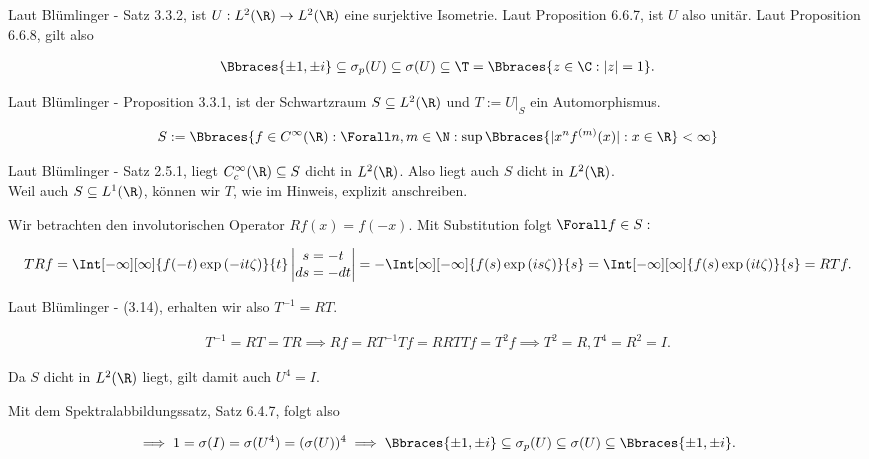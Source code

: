 \begin{solution}
Laut Blümlinger - Satz 3.3.2, ist $U: L^2(\R) \to L^2(\R)$ eine surjektive Isometrie.
Laut Proposition 6.6.7, ist $U$ also unitär.
Laut Proposition 6.6.8, gilt also

\begin{align*}
  \Bbraces{\pm 1, \pm i}
  \subseteq
  \sigma_p(U)
  \subseteq
  \sigma(U)
  \subseteq
  \T
  =
  \Bbraces{z \in \C: |z| = 1}.
\end{align*}


Laut Blümlinger - Proposition 3.3.1, ist der Schwartzraum $S \subseteq L^2(\R)$ und $T := U|_S$ ein Automorphismus.

\begin{align*}
  S
  :=
  \Bbraces
  {
    f \in C^\infty(\R):
    \Forall n, m \in \N:
    \sup \Bbraces{|x^n f^{(m)}(x)| : x \in \R} < \infty
  }
\end{align*}


Laut Blümlinger - Satz 2.5.1, liegt $C_c^\infty(\R) \subseteq S$ dicht in $L^2(\R)$.
Also liegt auch $S$ dicht in $L^2(\R)$. \\

Weil auch $S \subseteq L^1(\R)$, können wir $T$, wie im Hinweis, explizit anschreiben. \\


Wir betrachten den involutorischen Operator $R f(x) = f(-x)$.
Mit Substitution folgt $\Forall f \in S:$

\begin{align*}
  T R f
  =
  \Int[-\infty][\infty]
  {f(-t) \exp{(-i t \zeta)}}{t}
  \begin{vmatrix}
    s = -t \\
    ds = -dt
  \end{vmatrix}
  =
  -\Int[\infty][-\infty]{f(s) \exp{(i s \zeta)}}{s}
  =
  \Int[-\infty][\infty]{f(s) \exp{(i t \zeta)}}{s}
  =
  R T f.
\end{align*}

Laut Blümlinger - (3.14), erhalten wir also $T^{-1} = R T$.

\begin{align*}
  T^{-1} = R T = T R
  \implies
  R f = R T^{-1} T f = R R T T f = T^2 f
  \implies
  T^2 = R, T^4 = R^2 = I.
\end{align*}

Da $S$ dicht in $L^2(\R)$ liegt, gilt damit auch $U^4 = I$.


Mit dem Spektralabbildungssatz, Satz 6.4.7, folgt also

\begin{align*}
  \implies
  1 = \sigma(I) = \sigma(U^4) = (\sigma(U))^4
  \implies
  \Bbraces{\pm 1, \pm i}
  \subseteq
  \sigma_p(U)
  \subseteq
  \sigma(U)
  \subseteq
  \Bbraces{\pm 1, \pm i}.
\end{align*}

\end{solution}
